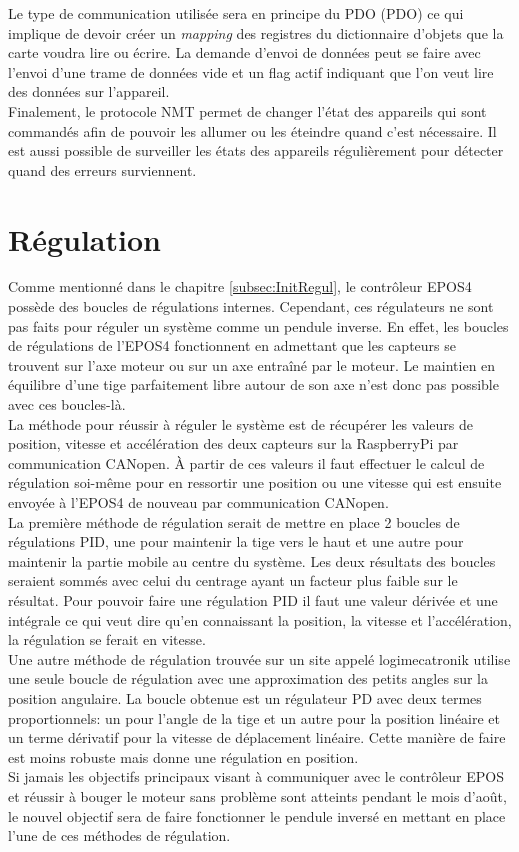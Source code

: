 Le type de communication utilisée sera en principe du \acrlong{PDO} (PDO) ce qui implique de devoir créer un \textit{mapping} des registres du
dictionnaire d'objets que la carte voudra lire ou écrire. La demande d'envoi de données peut se faire avec l'envoi d'une trame de données vide
et un flag actif indiquant que l'on veut lire des données sur l'appareil.\\

Finalement, le protocole \acrshort{NMT} permet de changer l'état des appareils qui sont commandés afin de pouvoir les allumer ou les éteindre
quand c'est nécessaire. Il est aussi possible de surveiller les états des appareils régulièrement pour détecter quand des erreurs surviennent.

\section{Régulation}
Comme mentionné dans le chapitre \ref{subsec:InitRegul}, le contrôleur EPOS4 possède des boucles de régulations internes. Cependant, ces régulateurs
ne sont pas faits pour réguler un système comme un pendule inverse. En effet, les boucles de régulations de l'EPOS4 fonctionnent en admettant que
les capteurs se trouvent sur l'axe moteur ou sur un axe entraîné par le moteur. Le maintien en équilibre d'une tige parfaitement libre autour de son
axe n'est donc pas possible avec ces boucles-là.\\

La méthode pour réussir à réguler le système est de récupérer les valeurs de position, vitesse et accélération des deux capteurs sur la RaspberryPi
par communication CANopen. À partir de ces valeurs il faut effectuer le calcul de régulation soi-même pour en ressortir une position ou une vitesse
qui est ensuite envoyée à l'EPOS4 de nouveau par communication CANopen.\\

La première méthode de régulation serait de mettre en place 2 boucles de régulations PID, une pour maintenir la tige vers le haut et une autre pour
maintenir la partie mobile au centre du système. Les deux résultats des boucles seraient sommés avec celui du centrage ayant un facteur plus faible
sur le résultat. Pour pouvoir faire une régulation PID il faut une valeur dérivée et une intégrale ce qui veut dire qu'en connaissant la position,
la vitesse et l'accélération, la régulation se ferait en vitesse.\\

Une autre méthode de régulation trouvée sur un site appelé logimecatronik \cite{logimecatronik} utilise une seule boucle de régulation avec une
approximation des petits angles sur la position angulaire. La boucle obtenue est un régulateur PD avec deux termes proportionnels: un pour l'angle
de la tige et un autre pour la position linéaire et un terme dérivatif pour la vitesse de déplacement linéaire. Cette manière de faire est moins
robuste mais donne une régulation en position.\\

Si jamais les objectifs principaux visant à communiquer avec le contrôleur EPOS et réussir à bouger le moteur sans problème sont atteints pendant
le mois d'août, le nouvel objectif sera de faire fonctionner le pendule inversé en mettant en place l'une de ces méthodes de régulation.


